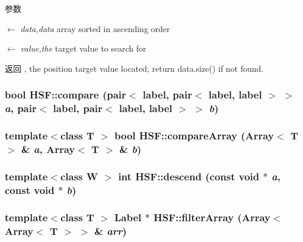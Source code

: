 \begin{DoxyParams}{参数}
\item[\mbox{$\leftarrow$} {\em data,data}]array sorted in ascending order \item[\mbox{$\leftarrow$} {\em value,the}]target value to search for \end{DoxyParams}
\begin{DoxyReturn}{返回}
, the position target value located; return data.size() if not found. 
\end{DoxyReturn}
\hypertarget{namespaceHSF_abf1b25a2c8c88bb66bd6d26b393092c6}{
\subsubsection[{compare}]{\setlength{\rightskip}{0pt plus 5cm}bool HSF::compare (pair$<$ label, pair$<$ label, label $>$ $>$ {\em a}, \/  pair$<$ label, pair$<$ label, label $>$ $>$ {\em b})}}
\label{namespaceHSF_abf1b25a2c8c88bb66bd6d26b393092c6}
\hypertarget{namespaceHSF_ac88bbd915979e88035d9a4d139569eb0}{
\subsubsection[{compareArray}]{\setlength{\rightskip}{0pt plus 5cm}template$<$class T $>$ bool HSF::compareArray (Array$<$ T $>$ \& {\em a}, \/  Array$<$ T $>$ \& {\em b})}}
\label{namespaceHSF_ac88bbd915979e88035d9a4d139569eb0}
\hypertarget{namespaceHSF_af2cc1f9a74df5f0056e658379f5af92e}{
\subsubsection[{descend}]{\setlength{\rightskip}{0pt plus 5cm}template$<$class W $>$ int HSF::descend (const void $\ast$ {\em a}, \/  const void $\ast$ {\em b})}}
\label{namespaceHSF_af2cc1f9a74df5f0056e658379f5af92e}
\hypertarget{namespaceHSF_ab2755628cd2d2f86aa337f1f19b1fb1c}{
\subsubsection[{filterArray}]{\setlength{\rightskip}{0pt plus 5cm}template$<$class T $>$ {\bf Label} $\ast$ HSF::filterArray (Array$<$ Array$<$ T $>$ $>$ \& {\em arr})}}
\label{namespaceHSF_ab2755628cd2d2f86aa337f1f19b1fb1c}


